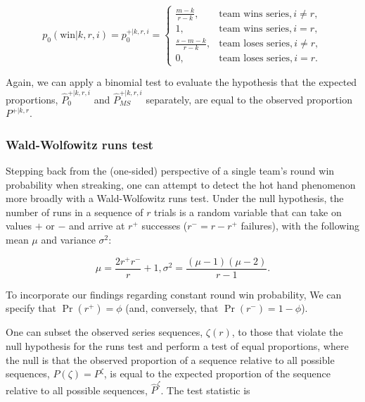 \documentclass{article}
\begin{document}
\begin{equation}\label{eq:pwkri}
p_0(\text{win} | k, r, i) = p^{+|k,r,i}_0 = \begin{cases}
  \frac{m - k}{r - k}, & \text{team wins series}, i \neq r, \\
  1, & \text{team wins series}, i = r, \\
  \frac{s - m - k}{r - k}, & \text{team loses series}, i \neq r, \\
  0, & \text{team loses series}, i = r.
\end{cases}
\end{equation}

Again, we can apply a binomial test to evaluate the hypothesis that the
expected proportions, \(\hat{P}^{+|k,r,i}_0\) and
\(\hat{P}^{+|k,r,i}_{MS}\) separately, are equal to the observed
proportion \(P^{+|k,r}\).

\hypertarget{wald-wolfowitz-runs-test}{%
\subsubsection{Wald-Wolfowitz runs
test}\label{wald-wolfowitz-runs-test}}

Stepping back from the (one-sided) perspective of a single team's round
win probability when streaking, one can attempt to detect the hot hand
phenomenon more broadly with a Wald-Wolfowitz runs test. Under the null
hypothesis, the number of runs in a sequence of \(r\) trials is a random
variable that can take on values \(+\) or \(-\) and arrive at \(r^+\)
successes (\(r^- = r - r^+\) failures), with the following mean \(\mu\)
and variance \(\sigma^2\):

\begin{equation}\label{eq:ww}
\mu = \frac{2r^{+}r^{-}}{r} + 1, \sigma^2 = \frac{(\mu-1)(\mu-2)}{r-1}.
\end{equation}

To incorporate our findings regarding constant round win probability, We
can specify that \(\Pr(r^+) = \phi\) (and, conversely, that
\(\Pr(r^-) = 1 - \phi\)).

One can subset the observed series sequences, \(\zeta(r)\), to those
that violate the null hypothesis for the runs test and perform a test of
equal proportions, where the null is that the observed proportion of a
sequence relative to all possible sequences, \(P(\zeta) = P^\zeta\), is
equal to the expected proportion of the sequence relative to all
possible sequences, \(\hat{P}^\zeta\). The test statistic is
\end{document}
